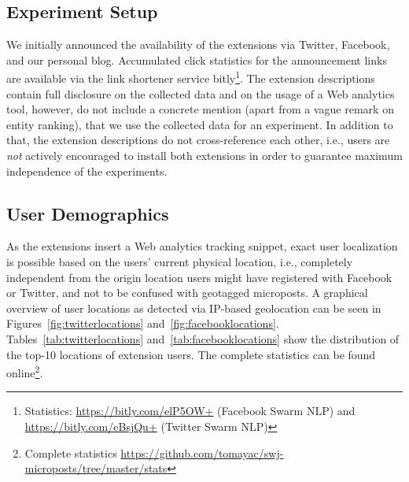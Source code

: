 \documentclass{iosart2c}
\begin{document}
\subsection{Experiment Setup}
We initially announced the availability of the extensions via Twitter, Facebook, and our personal blog.
Accumulated click statistics for the announcement links are available via the link shortener service bitly\footnote{Statistics: \url{https://bitly.com/elP5OW+} (Facebook Swarm NLP) and \url{https://bitly.com/eBsjQu+} (Twitter Swarm NLP)}.
The extension descriptions contain full disclosure on the collected data and on the usage of a Web analytics tool, however, do not include a concrete mention (apart from a vague remark on entity ranking), that we use the collected data for an experiment.
In addition to that, the extension descriptions do not cross-reference each other, i.e., users are \emph{not} actively encouraged to install both extensions in order to guarantee maximum independence of the experiments.

\subsection{User Demographics} 
As the extensions insert a Web analytics tracking snippet, exact user localization is possible based on the users' current physical location, i.e., completely independent from the origin location users might have registered with Facebook or Twitter, and not to be confused with geotagged microposts.
A graphical overview of user locations as detected via IP-based geolocation can be seen in Figures~\ref{fig:twitterlocations} and~\ref{fig:facebooklocations}.
Tables~\ref{tab:twitterlocations} and~\ref{tab:facebooklocations} show the distribution of the top-10 locations of extension users. 
The complete statistics can be found online\footnote{Complete statistics \url{https://github.com/tomayac/swj-microposts/tree/master/stats}}.
\end{document}
